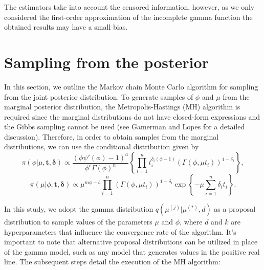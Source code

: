 \documentclass[]{interact}
\theoremstyle{plain}%
\theoremstyle{definition}
\theoremstyle{remark}
\begin{document}
The estimators take into account the censored information, however, as we only considered the first-order approximation of the incomplete gamma function the obtained results may have a small bias.


\section{Sampling from the posterior}\label{samplingpost}

In this section, we outline the Markov chain Monte Carlo algorithm for sampling from the joint posterior distribution.  To generate samples of $\phi$ and $\mu$ from the marginal posterior distribution, {\color{black}the Metropolis-Hastings (MH) algorithm is required since the marginal distributions do not have closed-form expressions and the Gibbs sampling cannot be used (see Gamerman and Lopes \cite{gamerman2006markov} for a detailed discussion)}. Therefore, in order to obtain samples from the marginal distributions, we can use the conditional distribution given by 
\begin{equation}\label{cond1}
\pi(\phi|\mu,\boldsymbol{t,\delta})\propto \frac{(\phi\psi'(\phi)-1)^{a}}{\phi^{c}\Gamma(\phi)^n}\left\{\prod_{i=1}^n{t_i^{\delta_i(\phi-1)}}\left(\Gamma(\phi,\mu t_i)\right)^{1-\delta_i}\right\},
\end{equation}
\begin{equation*}%
\pi(\mu|\phi,\boldsymbol{t,\delta})\propto \mu^{m\phi-b}\prod_{i=1}^n\left(\Gamma(\phi,\mu t_i)\right)^{1-\delta_i}\exp\left\{-\mu\sum_{i=1}^n {\delta_i}t_i\right\}.
\end{equation*}


In this study, we adopt the gamma distribution $q(\mu^{(j)}|\mu^{(*)},d)$ as a proposal distribution to sample values of the parameters $\mu$ and $\phi$, where $d$ and $k$ are hyperparameters that influence the convergence rate of the algorithm. It's important to note that alternative proposal distributions can be utilized in place of the gamma model, such as any model that generates values in the positive real line. The subsequent steps detail the execution of the MH algorithm:
\end{document}
